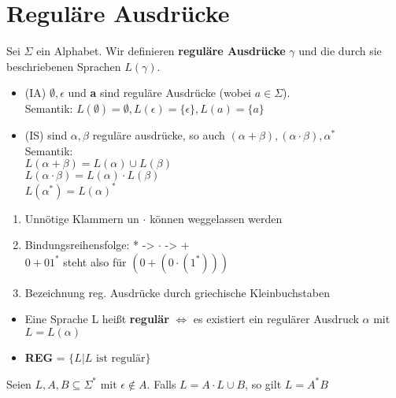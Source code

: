 \documentclass[14pt]{article}
\begin{document}
\section{Reguläre Ausdrücke}
\begin{definition}
    Sei $\varSigma$ ein Alphabet. Wir definieren \textbf{reguläre Ausdrücke} $\gamma$ und
    die durch sie beschriebenen Sprachen $L(\gamma)$. \\
    \begin{itemize}
        \item (IA) $\emptyset, \epsilon$ und \textbf{a} sind reguläre Ausdrücke (wobei $
        a \in \varSigma$). \\
        Semantik: $L(\emptyset) = \emptyset, L(\epsilon) = \{\epsilon\}, L(a) =\{a\}$
        \item (IS) sind $\alpha, \beta$ reguläre ausdrücke, so auch $(\alpha + \beta), 
        (\alpha \cdot \beta), \alpha^*$ \\
        Semantik: \\
        $L(\alpha + \beta) = L(\alpha) \cup L(\beta)$ \\
        $L(\alpha \cdot \beta) = L(\alpha) \cdot L(\beta)$ \\
        $L(\alpha^*) = L(\alpha)^*$
    \end{itemize} 
    \begin{enumerate}
        \item Unnötige Klammern un $\cdot$ können weggelassen werden
        \item Bindungsreihensfolge: * -> $\cdot$ -> + \\
        $0 + 01^*$ steht also für $(0 + (0 \cdot (1^*)))$
        \item Bezeichnung reg. Ausdrücke durch griechische Kleinbuchstaben
    \end{enumerate}
\end{definition}
\begin{definition}
    \begin{itemize}
        \item Eine Sprache L heißt \textbf{regulär} $\Leftrightarrow$ es 
        existiert ein regulärer Ausdruck $\alpha$ mit $L = L(\alpha)$
        \item \textbf{REG} = $\{ L | L \text{ ist regulär}\}$
    \end{itemize}
\end{definition}
\begin{eigenschaft}
    Seien $L, A, B \subseteq \varSigma^*$ mit $\epsilon \notin A$. Falls
    $L = A \cdot L \cup B$, so gilt $L = A^* B$
\end{eigenschaft}
\end{document}
